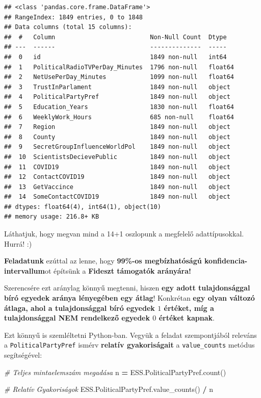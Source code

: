 \documentclass[
]{book}
\newenvironment{Shaded}{\begin{snugshade}}{\end{snugshade}}
\newcommand{\CommentTok}[1]{\textcolor[rgb]{0.56,0.35,0.01}{\textit{#1}}}
\newcommand{\NormalTok}[1]{#1}
\newcommand{\OperatorTok}[1]{\textcolor[rgb]{0.81,0.36,0.00}{\textbf{#1}}}
\begin{document}
\begin{verbatim}
## <class 'pandas.core.frame.DataFrame'>
## RangeIndex: 1849 entries, 0 to 1848
## Data columns (total 15 columns):
##  #   Column                          Non-Null Count  Dtype  
## ---  ------                          --------------  -----  
##  0   id                              1849 non-null   int64  
##  1   PoliticalRadioTVPerDay_Minutes  1796 non-null   float64
##  2   NetUsePerDay_Minutes            1099 non-null   float64
##  3   TrustInParlament                1849 non-null   object 
##  4   PoliticalPartyPref              1849 non-null   object 
##  5   Education_Years                 1830 non-null   float64
##  6   WeeklyWork_Hours                685 non-null    float64
##  7   Region                          1849 non-null   object 
##  8   County                          1849 non-null   object 
##  9   SecretGroupInfluenceWorldPol    1849 non-null   object 
##  10  ScientistsDecievePublic         1849 non-null   object 
##  11  COVID19                         1849 non-null   object 
##  12  ContactCOVID19                  1849 non-null   object 
##  13  GetVaccince                     1849 non-null   object 
##  14  SomeContactCOVID19              1849 non-null   object 
## dtypes: float64(4), int64(1), object(10)
## memory usage: 216.8+ KB
\end{verbatim}

Láthatjuk, hogy megvan mind a 14+1 oszlopunk a megfelelő adattípusokkal. Hurrá! :)

\textbf{Feladatunk} ezúttal az lenne, hogy \textbf{99\%-os megbízhatóságú konfidencia-intervallum}ot építsünk a \textbf{Fideszt támogatók arányára!}

Szerencsére ezt aránylag könnyű megtenni, hiszen \textbf{egy adott tulajdonsággal bíró egyedek aránya lényegében egy átlag}! Konkrétan \textbf{egy olyan változó átlaga, ahol a tulajdonsággal bíró egyedek \(1\) értéket, míg a tulajdonsággal NEM rendelkező egyedek \(0\) értéket kapnak}.

Ezt könnyű is szemléltetni Python-ban. Vegyük a feladat szempontjából releváns a \texttt{PoliticalPartyPref} ismérv \textbf{relatív gyakoriságait} a \texttt{value\_counts} metódus segítségével:

\begin{Shaded}
\begin{Highlighting}[]
\CommentTok{\# Teljes mintaelemszám megadása}
\NormalTok{n }\OperatorTok{=}\NormalTok{ ESS.PoliticalPartyPref.count()}

\CommentTok{\# Relatív Gyakoriságok}
\NormalTok{ESS.PoliticalPartyPref.value\_counts() }\OperatorTok{/}\NormalTok{ n}
\end{Highlighting}
\end{Shaded}
\end{document}
